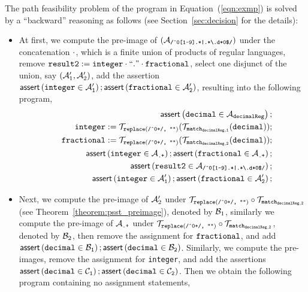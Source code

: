 The path feasibility problem of the program in Equation~(\ref{eqn:exmp}) is solved by a ``backward'' reasoning as follows (see Section~\ref{sec:decision} for the details):  
\begin{itemize}
\item At first, we compute the pre-image of $(\mathcal{A}_{\scriptsize\mbox{\tt /\^{}0[1-9].*|.*{\scriptsize\textbackslash}.d*0\$/}})$ under the concatenation $\cdot$, which is a finite union of products of regular languages, remove $\tt result2 := integer \cdot ``." \cdot fractional$, select one disjunct of the union, say $(\mathcal{A}'_1, \mathcal{A}'_2)$, add the assertion $\textsf{assert}\left(\tt integer \in \mathcal{A}'_1\right);\textsf{assert}\left(\tt fractional \in \mathcal{A}'_2\right)$, resulting into the following program,
\begin{eqnarray}\label{eqn:exmp-2}
& & \textsf{assert}\left(\tt decimal \in \mathcal{A}_{decimalReg}\right);\nonumber \\
& & \tt integer  := \tt  \mathcal{T}_{\tt replace(\mbox{\scriptsize \tt /\^{}0+/, ""})}(\mathcal{T}_{\tt match_{decimalReg,1}}(decimal));\nonumber \\
& & \tt fractional  := \tt  \mathcal{T}_{\scriptsize\tt replace(\mbox{\tt /\^{}0+/, ""})}(\mathcal{T}_{\tt match_{decimalReg,2}}(decimal));\nonumber \\
&&  \textsf{assert}\left(\tt integer \in \mathcal{A}_{\scriptsize\mbox{\tt.+}}\right); 
  \textsf{assert}\left(\tt fractional \in \mathcal{A}_{\scriptsize\mbox{\tt.+}}\right); \nonumber\\
 && \textsf{assert}\left(\tt result2 \in \mathcal{A}_{\scriptsize\mbox{\tt /\^{}0[1-9].*|.*{\scriptsize\textbackslash}.d*0\$/}}\right); \nonumber\\
  && \textsf{assert}\left(\tt integer \in \mathcal{A}'_1\right);\textsf{assert}\left(\tt fractional \in \mathcal{A}'_2\right); 
\end{eqnarray}
%
\item Next, we compute the pre-image of $\mathcal{A}'_2$ under $\mathcal{T}_{\tt replace(\mbox{\scriptsize \tt /\^{}0+/, ""})} \circ \mathcal{T}_{\tt match_{decimalReg,2}}$ (see Theorem~\ref{theorem:psst_preimage}), denoted by $\mathcal{B}_1$, similarly we compute the pre-image of $\mathcal{A}_{\scriptsize\mbox{\tt.+}}$ under $\mathcal{T}_{\tt replace(\mbox{\scriptsize \tt /\^{}0+/, ""})} \circ \mathcal{T}_{\tt match_{decimalReg,2}}$,  denoted by $\mathcal{B}_2$, then remove the assignment for  $\tt fractional$, and add $\textsf{assert}\left(\tt decimal \in \mathcal{B}_1\right);\textsf{assert}\left(\tt decimal \in \mathcal{B}_2\right)$. Similarly, we compute the pre-images, remove the assignment for {\tt integer}, and add the assertions $\textsf{assert}\left(\tt decimal \in \mathcal{C}_1\right);\textsf{assert}\left(\tt decimal \in \mathcal{C}_2\right)$. Then we obtain the following program containing no assignment statements, 

\end{itemize}
